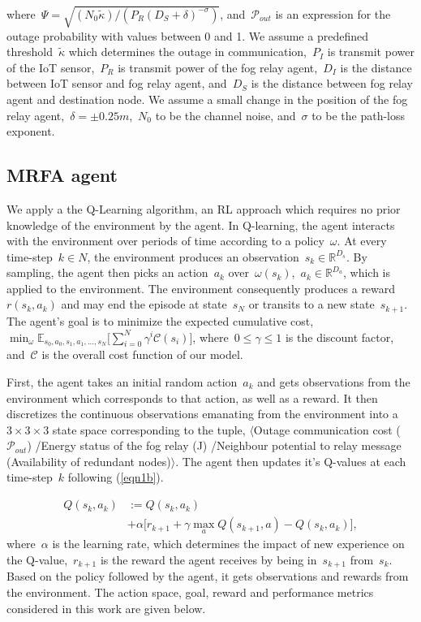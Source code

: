 \documentclass[journal]{IEEEtran}
\begin{document}
where~$\Psi = \sqrt{(N_0 \tilde{\kappa})/(P_{R}(D_{S} + \delta)^{-\sigma})}$, and~$\mathcal{P}_{out}$ is an expression for the outage probability with values between 0 and 1. We assume a predefined threshold~$\tilde{\kappa}$ which determines the outage in communication,~$P_{I}$ is transmit power of the IoT sensor,~$P_{R}$ is transmit power of the fog relay agent,~$D_{I}$ is the distance between IoT sensor and fog relay agent, and~$D_{S}$ is the distance between fog relay agent and destination node. We assume a small change in the position of the fog relay agent,~$\delta = \pm0.25 m$,~$N_0$ to be the channel noise, and~$\sigma$ to be the path-loss exponent.



\subsection{MRFA agent}
We apply a the Q-Learning algorithm, an RL approach which requires no prior knowledge of the environment by the agent. In Q-learning, the agent interacts with the environment over periods of time according to a policy~$\omega$. At every time-step~$k \in N$, the environment produces an observation~$s_{k} \in \mathbb{R}^{D_s}$. By sampling, the agent then picks an action~$a_{k}$ over~$\omega(s_{k})$,~$a_{k} \in \mathbb{R}^{D_a}$, which is applied to the environment. The environment consequently produces a reward~$r(s_{k}, a_{k})$ and may end the episode at state~$s_{N}$ or transits to a new state~$s_{k + 1}$. The agent's goal is to minimize the expected cumulative cost,~$\min_{\omega} \mathbb{E}_{s_0, a_0, s_1, a_1, ..., s_N} \Big[ \sum_{i=0}^{N} \gamma^i \mathcal{C}(s_i) \Big]$, where~$0 \leq \gamma \leq 1$ is the discount factor, and~$\mathcal{C}$ is the overall cost function of our model.

First, the agent takes an initial random action~$a_{k}$ and gets observations from the environment which corresponds to that action, as well as a reward. It then discretizes the continuous observations emanating from the environment into a~$3 \times 3 \times 3$ state space corresponding to the tuple, $\langle$Outage communication cost ($\mathcal{P}_{out}$) /Energy status of the fog relay (J) /Neighbour potential to relay message (Availability of redundant nodes)$\rangle$. The agent then updates it's Q-values at each time-step~$k$ following (\ref{eqn1b}).

\begin{equation}\label{eqn1b}
\begin{split}
Q(s_k, a_k) &:= Q(s_k, a_k)\\
& + \alpha \Big[ r_{k + 1} + \gamma \max_{a}  Q(s_{k + 1}, a) -  Q(s_k, a_k) \Big],
   \end{split}
\end{equation}
where~$\alpha$ is the learning rate, which determines the impact of new experience on the Q-value,~$r_{k + 1}$ is the reward the agent receives by being in~$s_{k + 1}$ from~$s_{k}$. Based on the policy followed by the agent, it gets observations and rewards from the environment. The action space, goal, reward and performance metrics considered in this work are given below.
\end{document}
